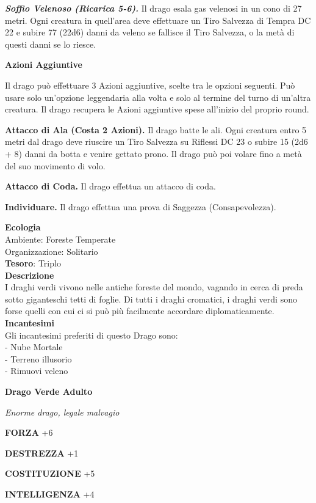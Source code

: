 \begin{multicols}{2}
\textit{\textbf{Soffio Velenoso (Ricarica 5-6).}} Il drago esala gas velenosi in un cono di 27 metri. Ogni creatura in quell'area deve effettuare un Tiro Salvezza di Tempra DC 22 e subire 77 (22d6) danni da veleno se fallisce il Tiro Salvezza, o la metà di questi danni se lo riesce.

\textbf{Azioni Aggiuntive}

Il drago può effettuare 3 Azioni aggiuntive, scelte tra le opzioni seguenti. Può usare solo un'opzione leggendaria alla volta e solo al termine del turno di un'altra creatura. Il drago recupera le Azioni aggiuntive spese all'inizio del proprio round.

\textbf{Attacco di Ala (Costa 2 Azioni).} Il drago batte le ali. Ogni creatura entro 5 metri dal drago deve riuscire un Tiro Salvezza su Riflessi DC 23 o subire 15 (2d6 + 8) danni da botta e venire gettato prono. Il drago può poi volare fino a metà del suo movimento di volo.

\textbf{Attacco di Coda.} Il drago effettua un attacco di coda.

\textbf{Individuare.} Il drago effettua una prova di Saggezza (Consapevolezza).

\textbf{Ecologia}\\
Ambiente: Foreste Temperate\\
Organizzazione: Solitario\\
\textbf{Tesoro}: Triplo\\
\textbf{Descrizione}\\
I draghi verdi vivono nelle antiche foreste del mondo, vagando in cerca di preda sotto giganteschi tetti di foglie. Di tutti i draghi cromatici, i draghi verdi sono forse quelli con cui ci si può più facilmente accordare diplomaticamente.\\
\textbf{Incantesimi}\\
Gli incantesimi preferiti di questo Drago sono:\\
- Nube Mortale\\
- Terreno illusorio\\
- Rimuovi veleno


\medskip{}\textbf{Drago Verde Adulto}

\textit{Enorme drago, legale malvagio}

\textbf{FORZA} +6

\textbf{DESTREZZA} +1

\textbf{COSTITUZIONE} +5

\textbf{INTELLIGENZA} +4


\end{multicols}
